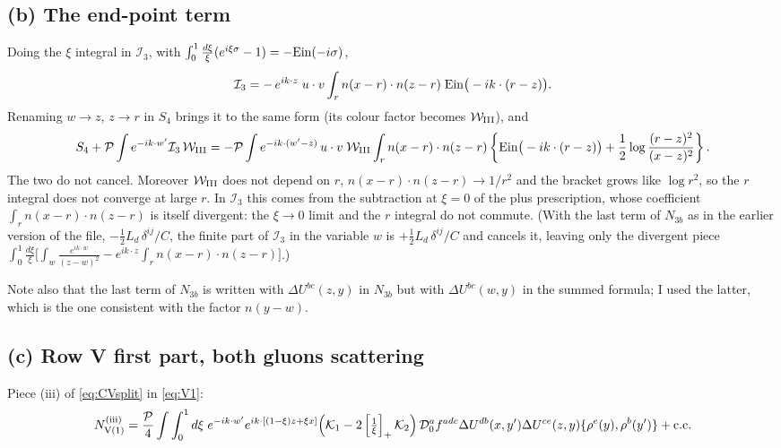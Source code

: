 \documentclass[10pt]{article}
\numberwithin{equation}{section}
\begin{document}
\subsection{(b) The end-point term}
Doing the $\xi$ integral in $\mathcal{I}_{3}$, with $\int_{0}^{1}\frac{d\xi}{\xi}(e^{i\xi\sigma}-1)=-{\rm Ein}(-i\sigma)$,
\begin{align}
\mathcal{I}_{3}=-\,e^{ik\cdot z}\;u\cdot v\int_{r}n(x-r)\cdot n(z-r)\;{\rm Ein}\big(-ik\cdot(r-z)\big).
\end{align}
Renaming $w\to z$, $z\to r$ in $S_{4}$ brings it to the same form (its colour factor becomes $\mathcal{W}_{\rm III}$), and
\begin{align}
S_{4}+\mathcal{P}\int e^{-ik\cdot w'}\mathcal{I}_{3}\,\mathcal{W}_{\rm III}
=-\mathcal{P}\int e^{-ik\cdot(w'-z)}\,u\cdot v\;\mathcal{W}_{\rm III}\int_{r}n(x-r)\cdot n(z-r)\left\{{\rm Ein}\big(-ik\cdot(r-z)\big)+\frac12\log\frac{(r-z)^{2}}{(x-z)^{2}}\right\}.
\end{align}
The two do not cancel. Moreover $\mathcal{W}_{\rm III}$ does not depend on $r$, $n(x-r)\cdot n(z-r)\to1/r^{2}$ and the bracket grows like $\log r^{2}$, so the $r$ integral does not converge at large $r$. In $\mathcal{I}_{3}$ this comes from the subtraction at $\xi=0$ of the plus prescription, whose coefficient $\int_{r}n(x-r)\cdot n(z-r)$ is itself divergent: the $\xi\to0$ limit and the $r$ integral do not commute. (With the last term of $N_{3b}$ as in the earlier version of the file, $-\tfrac12L_{d}\,\delta^{ij}/C$, the finite part of $\mathcal{I}_{3}$ in the variable $w$ is $+\tfrac12L_{d}\,\delta^{ij}/C$ and cancels it, leaving only the divergent piece $\int_{0}^{1}\frac{d\xi}{\xi}\big[\int_{w}\frac{e^{ik\cdot w}}{(z-w)^{2}}-e^{ik\cdot z}\int_{r}n(x-r)\cdot n(z-r)\big]$.)

Note also that the last term of $N_{3b}$ is written with $\Delta U^{bc}(z,y)$ in $N_{3b}$ but with $\Delta U^{bc}(w,y)$ in the summed formula; I used the latter, which is the one consistent with the factor $n(y-w)$.

\subsection{(c) Row V first part, both gluons scattering}
Piece (iii) of \eqref{eq:CVsplit} in \eqref{eq:V1}:
\begin{align}
N_{\rm V(1)}^{\rm (iii)}=\frac{\mathcal{P}}{4}\int\int_{0}^{1}d\xi\;e^{-ik\cdot w'}e^{ik\cdot[(1-\xi)z+\xi x]}\Big(\mathcal{K}_{1}-2\left[\tfrac1\xi\right]_{+}\mathcal{K}_{2}\Big)\,\mathcal{D}_{0}^{a}f^{adc}\Delta U^{db}(x,y')\Delta U^{ce}(z,y)\{\rho^{e}(y),\rho^{b}(y')\}+{\rm c.c.}
\end{align}
\end{document}
